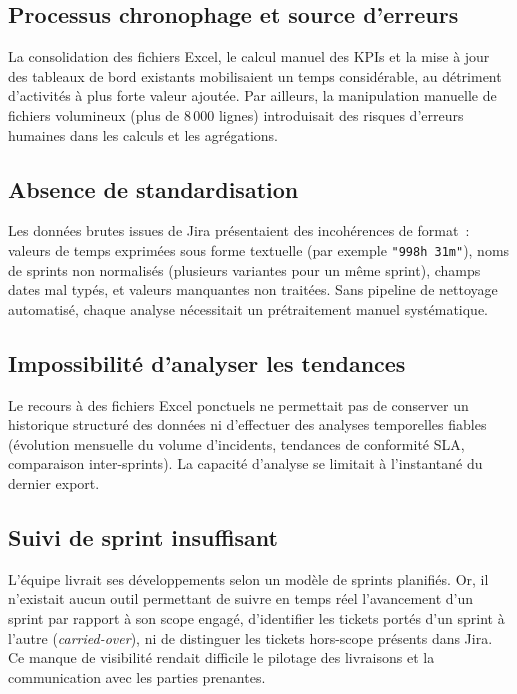 \documentclass[12pt, a4paper]{report}
\begin{document}
\subsection{Processus chronophage et source d'erreurs}

La consolidation des fichiers Excel, le calcul manuel des KPIs et la mise à jour des tableaux de bord existants mobilisaient un temps considérable, au détriment d'activités à plus forte valeur ajoutée. Par ailleurs, la manipulation manuelle de fichiers volumineux (plus de 8\,000 lignes) introduisait des risques d'erreurs humaines dans les calculs et les agrégations.

\subsection{Absence de standardisation}

Les données brutes issues de Jira présentaient des incohérences de format~: valeurs de temps exprimées sous forme textuelle (par exemple \texttt{"998h 31m"}), noms de sprints non normalisés (plusieurs variantes pour un même sprint), champs dates mal typés, et valeurs manquantes non traitées. Sans pipeline de nettoyage automatisé, chaque analyse nécessitait un prétraitement manuel systématique.

\subsection{Impossibilité d'analyser les tendances}

Le recours à des fichiers Excel ponctuels ne permettait pas de conserver un historique structuré des données ni d'effectuer des analyses temporelles fiables (évolution mensuelle du volume d'incidents, tendances de conformité SLA, comparaison inter-sprints). La capacité d'analyse se limitait à l'instantané du dernier export.

\subsection{Suivi de sprint insuffisant}

L'équipe livrait ses développements selon un modèle de sprints planifiés. Or, il n'existait aucun outil permettant de suivre en temps réel l'avancement d'un sprint par rapport à son scope engagé, d'identifier les tickets portés d'un sprint à l'autre (\textit{carried-over}), ni de distinguer les tickets hors-scope présents dans Jira. Ce manque de visibilité rendait difficile le pilotage des livraisons et la communication avec les parties prenantes.
\end{document}
